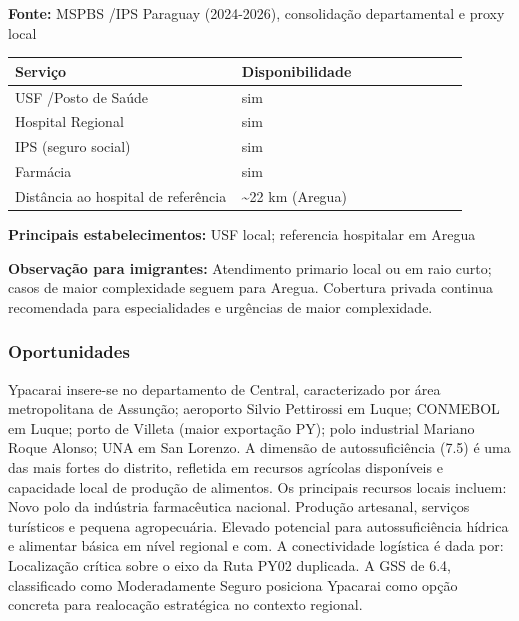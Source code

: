 \textbf{Fonte:} MSPBS /\allowbreak  IPS Paraguay (2024-2026), consolidação
departamental e proxy local

{\def\LTcaptype{none} %
\begin{longtable}{@{}>{\raggedright\arraybackslash}p{0.45\linewidth} >{\raggedright\arraybackslash}p{0.45\linewidth}@{}}
\toprule\noalign{}
Serviço & Disponibilidade \\
\midrule\noalign{}
\endhead
\bottomrule\noalign{}
\endlastfoot
USF /\allowbreak  Posto de Saúde & sim \\
Hospital Regional & sim \\
IPS (seguro social) & sim \\
Farmácia & sim \\
Distância ao hospital de referência & \textasciitilde22 km (Aregua) \\
\end{longtable}
}

\textbf{Principais estabelecimentos:} USF local; referencia hospitalar
em Aregua

\textbf{Observação para imigrantes:} Atendimento primario local ou em
raio curto; casos de maior complexidade seguem para Aregua. Cobertura
privada continua recomendada para especialidades e urgências de maior
complexidade.
\newpage

\subsubsection*{Oportunidades}\label{oport-ypacarai-1117}
Ypacarai insere-se no departamento de Central, caracterizado por área metropolitana de Assunção; aeroporto Silvio Pettirossi em Luque; CONMEBOL em Luque; porto de Villeta (maior exportação PY); polo industrial Mariano Roque Alonso; UNA em San Lorenzo. A dimensão de autossuficiência (7.5) é uma das mais fortes do distrito, refletida em recursos agrícolas disponíveis e capacidade local de produção de alimentos. Os principais recursos locais incluem: Novo polo da indústria farmacêutica nacional. Produção artesanal, serviços turísticos e pequena agropecuária. Elevado potencial para autossuficiência hídrica e alimentar básica em nível regional e com. A conectividade logística é dada por: Localização crítica sobre o eixo da Ruta PY02 duplicada. A GSS de 6.4, classificado como Moderadamente Seguro posiciona Ypacarai como opção concreta para realocação estratégica no contexto regional.

